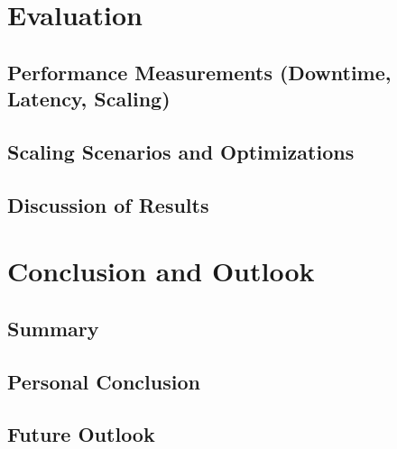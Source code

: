 \documentclass[11pt, a4paper, oneside, listof=totoc]{scrartcl}
\begin{document}
    \section{Evaluation}\label{sec:evaluation}

        \subsection[Performance Measurements]{Performance Measurements (Downtime, Latency, Scaling)}\label{subsec:performance}

        \subsection{Scaling Scenarios and Optimizations}\label{subsec:scalingOptimization}

        \subsection{Discussion of Results}\label{subsec:discussion}

    \section{Conclusion and Outlook}\label{sec:conclusion}

        \subsection{Summary}\label{subsec:summary}

        \subsection{Personal Conclusion}\label{subsec:personalConclusion}

        \subsection{Future Outlook}\label{subsec:outlook}

    \cleardoublepage{}
    \printbibliography[
        title = {References},
        heading = bibintoc
    ]

    \cleardoublepage{}
    \appendix
\end{document}
